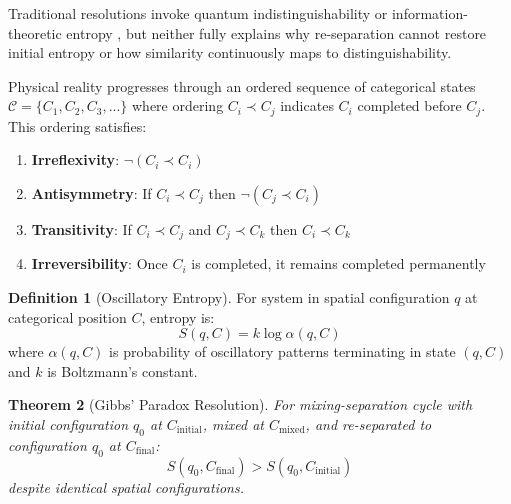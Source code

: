 \documentclass[11pt,a4paper]{article}
\newtheorem{theorem}{Theorem}[section]
\theoremstyle{definition}
\newtheorem{definition}[theorem]{Definition}
\theoremstyle{remark}
\begin{document}
Traditional resolutions invoke quantum indistinguishability \cite{Bach1997} or information-theoretic entropy \cite{Jaynes1992}, but neither fully explains why re-separation cannot restore initial entropy or how similarity continuously maps to distinguishability.

\begin{axiom}
\label{ax:categorical}
Physical reality progresses through an ordered sequence of categorical states $\mathcal{C} = \{C_1, C_2, C_3, ...\}$ where ordering $C_i \prec C_j$ indicates $C_i$ completed before $C_j$. This ordering satisfies:
\begin{enumerate}
\item \textbf{Irreflexivity}: $\neg(C_i \prec C_i)$
\item \textbf{Antisymmetry}: If $C_i \prec C_j$ then $\neg(C_j \prec C_i)$
\item \textbf{Transitivity}: If $C_i \prec C_j$ and $C_j \prec C_k$ then $C_i \prec C_k$
\item \textbf{Irreversibility}: Once $C_i$ is completed, it remains completed permanently
\end{enumerate}
\end{axiom}

\begin{definition}[Oscillatory Entropy]
For system in spatial configuration $q$ at categorical position $C$, entropy is:
\begin{equation}
S(q, C) = k \log \alpha(q, C)
\label{eq:oscillatory_entropy}
\end{equation}
where $\alpha(q, C)$ is probability of oscillatory patterns terminating in state $(q, C)$ and $k$ is Boltzmann's constant.
\end{definition}

\begin{theorem}[Gibbs' Paradox Resolution]
\label{thm:gibbs}
For mixing-separation cycle with initial configuration $q_0$ at $C_{\text{initial}}$, mixed at $C_{\text{mixed}}$, and re-separated to configuration $q_0$ at $C_{\text{final}}$:
\begin{equation}
S(q_0, C_{\text{final}}) > S(q_0, C_{\text{initial}})
\end{equation}
despite identical spatial configurations.
\end{theorem}
\end{document}
